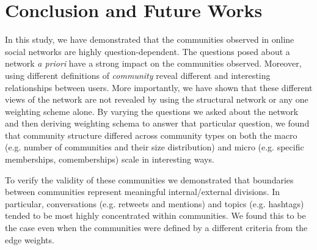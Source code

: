 \section{Conclusion and Future Works}



In this study, we have demonstrated that the communities observed in online social networks are highly question-dependent. The questions posed about a network \emph{a priori} have a strong impact on the communities observed.  Moreover, using different definitions of \emph{community} reveal different and interesting relationships between users. More importantly, we have shown that these different views of the network are not revealed by using the structural network or any one weighting scheme alone. By varying the questions we asked about the network and then deriving weighting schema to answer that particular question, we found that community structure differed across community types on both the macro (e.g. number of communities and their size distribution) and micro (e.g. specific memberships, comemberships) scale in interesting ways.


To verify the validity of these communities we demonstrated that boundaries between communities represent meaningful internal/external divisions. In particular, conversations (e.g. retweets and mentions) and topics (e.g. hashtags) tended to be most highly concentrated within communities. We found this to be the case even when the communities were defined by a different criteria from the edge weights. 

